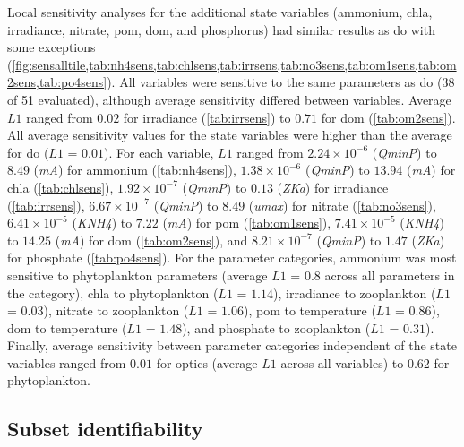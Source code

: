\documentclass[letterpaper,12pt,oneside]{article}\usepackage[]{graphicx}\usepackage[]{color}
\begin{document}
Local sensitivity analyses for the additional state variables (ammonium, \ac{chla}, irradiance, nitrate, \ac{pom}, \ac{dom}, and phosphorus) had similar results as \ac{do} with some exceptions (\cref{fig:sensalltile,tab:nh4sens,tab:chlsens,tab:irrsens,tab:no3sens,tab:om1sens,tab:om2sens,tab:po4sens}).  All variables were sensitive to the same parameters as \ac{do} (38 of 51 evaluated), although average sensitivity differed between variables.  Average $L1$ ranged from $0.02$ for irradiance (\cref{tab:irrsens}) to $0.71$ for \ac{dom} (\cref{tab:om2sens}).  All average sensitivity values for the state variables were higher than the average for \ac{do} ($L1$ = $0.01$).  For each variable, $L1$ ranged from $2.24\times 10^{-6}$ (\textit{QminP}) to $8.49$ (\textit{mA}) for ammonium (\cref{tab:nh4sens}), $1.38\times 10^{-6}$ (\textit{QminP}) to $13.94$ (\textit{mA}) for \ac{chla} (\cref{tab:chlsens}), $1.92\times 10^{-7}$ (\textit{QminP}) to $0.13$ (\textit{ZKa}) for irradiance (\cref{tab:irrsens}), $6.67\times 10^{-7}$ (\textit{QminP}) to $8.49$ (\textit{umax}) for nitrate (\cref{tab:no3sens}), $6.41\times 10^{-5}$ (\textit{KNH4}) to $7.22$ (\textit{mA}) for \ac{pom} (\cref{tab:om1sens}),  $7.41\times 10^{-5}$ (\textit{KNH4}) to $14.25$ (\textit{mA}) for \ac{dom} (\cref{tab:om2sens}), and $8.21\times 10^{-7}$ (\textit{QminP}) to $1.47$ (\textit{ZKa}) for phosphate (\cref{tab:po4sens}).  For the parameter categories, ammonium was most sensitive to phytoplankton parameters (average $L1$ = $0.8$ across all parameters in the category), \ac{chla} to phytoplankton ($L1$ = $1.14$), irradiance to zooplankton ($L1$ = $0.03$), nitrate to zooplankton ($L1$ = $1.06$), \ac{pom} to temperature ($L1$ = $0.86$), \ac{dom} to temperature ($L1$ = $1.48$), and phosphate to zooplankton ($L1$ = $0.31$).  Finally, average sensitivity between parameter categories independent of the state variables ranged from $0.01$ for optics (average $L1$ across all variables) to $0.62$ for phytoplankton. 

\subsection{Subset identifiability}
\end{document}
